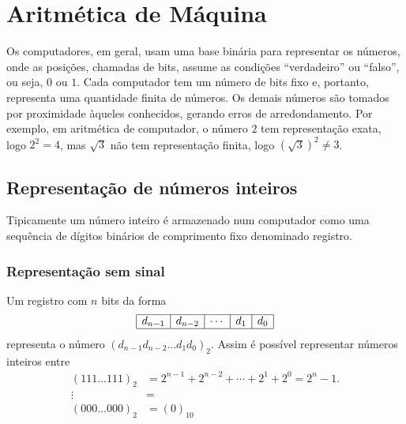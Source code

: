 \section{Aritmética de Máquina}
Os computadores, em geral, usam uma base binária para representar os números, onde as posições, chamadas de bits, assume as condições ``verdadeiro'' ou ``falso'', ou seja, $0$ ou $1$. Cada computador tem um número de bits fixo e, portanto, representa uma quantidade finita de números. Os demais números são tomados por proximidade àqueles conhecidos, gerando erros de arredondamento. Por exemplo, em aritmética de computador, o número $2$ tem representação exata, logo $2^2=4$, mas $\sqrt{3}$ não tem representação finita, logo $(\sqrt{3})^2\neq 3$.



\subsection{Representação de números inteiros}

Tipicamente um número inteiro é armazenado num computador como uma sequência de dígitos binários de comprimento fixo denominado registro.

\subsubsection{Representação sem sinal}
Um registro com $n$ bits da forma
$$
\begin{array}{|c|c|c|c|c|} \hline
d_{n-1}&d_{n-2}&\cdots&d_1&d_0\\\hline
\end{array}
$$
representa o número $(d_{n-1}d_{n-2}...d_1d_0)_2$. Assim é possível representar números inteiros entre
$$
\begin{array}{cl}
  (111...111)_2 & = 2^{n-1}+2^{n-2}+\cdots+2^1+2^0=2^n-1.\\
    \vdots      & = \\
  (000...000)_2 & = (0)_{10} \\
\end{array}
$$


